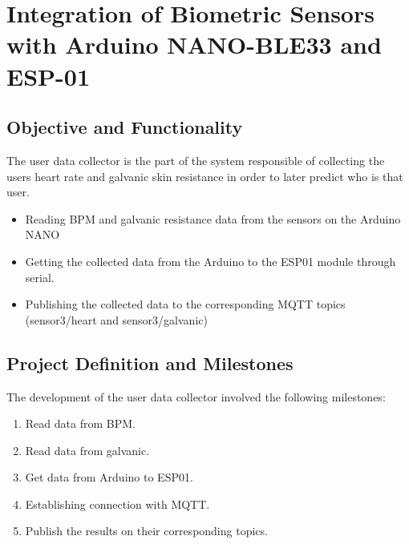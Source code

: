 \documentclass{article}
\begin{document}
\section{Integration of Biometric Sensors with Arduino NANO-BLE33 and ESP-01}

\subsection{Objective and Functionality}
The user data collector is the part of the system responsible of collecting the users heart rate and galvanic skin resistance in order to later predict who is that user.
\begin{itemize}
    \item Reading BPM and galvanic resistance data from the sensors on the Arduino NANO
    \item Getting the collected data from the Arduino to the ESP01 module through serial.
    \item Publishing the collected data to the corresponding MQTT topics (sensor3/heart and sensor3/galvanic)
\end{itemize}

\subsection{Project Definition and Milestones}
The development of the user data collector involved the following milestones:
\begin{enumerate}
    \item Read data from BPM.
    \item Read data from galvanic.
    \item Get data from Arduino to ESP01.
    \item Establishing connection with MQTT.
    \item Publish the results on their corresponding topics.
\end{enumerate}
\end{document}
